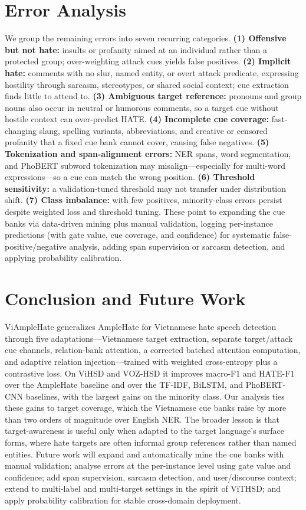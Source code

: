 \documentclass[11pt]{article}
\begin{document}
\section{Error Analysis}
We group the remaining errors into seven recurring categories. \textbf{(1) Offensive but not hate:} insults or profanity aimed at an individual rather than a protected group; over-weighting attack cues yields false positives. \textbf{(2) Implicit hate:} comments with no slur, named entity, or overt attack predicate, expressing hostility through sarcasm, stereotypes, or shared social context; cue extraction finds little to attend to. \textbf{(3) Ambiguous target reference:} pronouns and group nouns also occur in neutral or humorous comments, so a target cue without hostile context can over-predict HATE. \textbf{(4) Incomplete cue coverage:} fast-changing slang, spelling variants, abbreviations, and creative or censored profanity that a fixed cue bank cannot cover, causing false negatives. \textbf{(5) Tokenization and span-alignment errors:} NER spans, word segmentation, and PhoBERT subword tokenization may misalign---especially for multi-word expressions---so a cue can match the wrong position. \textbf{(6) Threshold sensitivity:} a validation-tuned threshold may not transfer under distribution shift. \textbf{(7) Class imbalance:} with few positives, minority-class errors persist despite weighted loss and threshold tuning. These point to expanding the cue banks via data-driven mining plus manual validation, logging per-instance predictions (with gate value, cue coverage, and confidence) for systematic false-positive/negative analysis, adding span supervision or sarcasm detection, and applying probability calibration.

\section{Conclusion and Future Work}
ViAmpleHate generalizes AmpleHate for Vietnamese hate speech detection through five adaptations---Vietnamese target extraction, separate target/attack cue channels, relation-bank attention, a corrected batched attention computation, and adaptive relation injection---trained with weighted cross-entropy plus a contrastive loss. On ViHSD and VOZ-HSD it improves macro-F1 and HATE-F1 over the AmpleHate baseline and over the TF-IDF, BiLSTM, and PhoBERT-CNN baselines, with the largest gains on the minority class. Our analysis ties these gains to target coverage, which the Vietnamese cue banks raise by more than two orders of magnitude over English NER. The broader lesson is that target-awareness is useful only when adapted to the target language's surface forms, where hate targets are often informal group references rather than named entities. Future work will expand and automatically mine the cue banks with manual validation; analyse errors at the per-instance level using gate value and confidence; add span supervision, sarcasm detection, and user/discourse context; extend to multi-label and multi-target settings in the spirit of ViTHSD; and apply probability calibration for stable cross-domain deployment.
\end{document}
